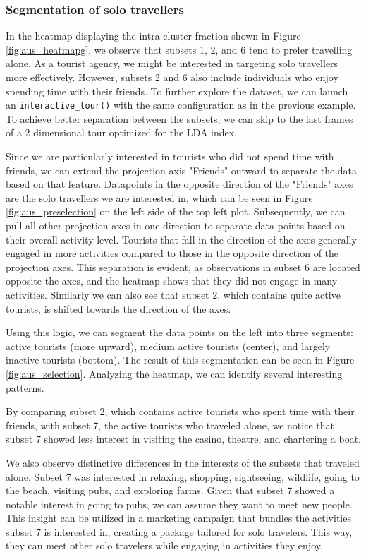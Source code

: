 \documentclass[article]{ajs}
\begin{document}
\subsubsection{Segmentation of solo travellers}

In the heatmap displaying the intra-cluster fraction shown in Figure \ref{fig:aus_heatmapg}, we observe that subsets 1, 2, and 6 tend to prefer travelling alone. As a tourist agency, we might be interested in targeting solo travellers more effectively. However, subsets 2 and 6 also include individuals who enjoy spending time with their friends. To further explore the dataset, we can launch an \texttt{interactive\_tour()} with the same configuration as in the previous example. To achieve better separation between the subsets, we can skip to the last frames of a 2 dimensional tour optimized for the LDA index. 

Since we are particularly interested in tourists who did not spend time with friends, we can extend the projection axis "Friends" outward to separate the data based on that feature. Datapoints in the opposite direction of the "Friends" axes are the solo travellers we are interested in, which can be seen in Figure \ref{fig:aus_preselection} on the left side of the top left plot. Subsequently, we can pull all other projection axes in one direction to separate data points based on their overall activity level. Tourists that fall in the direction of the axes generally engaged in more activities compared to those in the opposite direction of the projection axes. This separation is evident, as observations in subset 6 are located opposite the axes, and the heatmap shows that they did not engage in many activities. Similarly we can also see that subset 2, which contains quite active tourists, is shifted towards the direction of the axes.

Using this logic, we can segment the data points on the left into three segments: active tourists (more upward), medium active tourists (center), and largely inactive tourists (bottom). The result of this segmentation can be seen in Figure \ref{fig:aus_selection}. Analyzing the heatmap, we can identify several interesting patterns.

By comparing subset 2, which contains active tourists who spent time with their friends, with subset 7, the active tourists who traveled alone, we notice that subset 7 showed less interest in visiting the casino, theatre, and chartering a boat.

We also observe distinctive differences in the interests of the subsets that traveled alone. Subset 7 was interested in relaxing, shopping, sightseeing, wildlife, going to the beach, visiting pubs, and exploring farms. Given that subset 7 showed a notable interest in going to pubs, we can assume they want to meet new people. This insight can be utilized in a marketing campaign that bundles the activities subset 7 is interested in, creating a package tailored for solo travelers. This way, they can meet other solo travelers while engaging in activities they enjoy.
\end{document}

